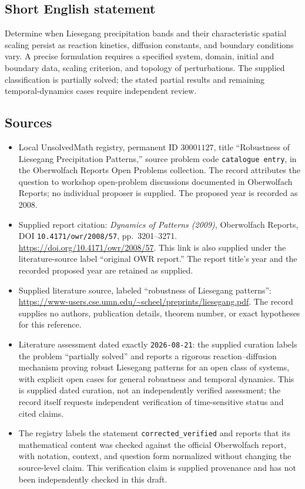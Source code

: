 \documentclass[11pt]{article}
\begin{document}
\subsection{Short English statement}
Determine when Liesegang precipitation bands and their characteristic spatial scaling persist as reaction kinetics, diffusion constants, and boundary conditions vary. A precise formulation requires a specified system, domain, initial and boundary data, scaling criterion, and topology of perturbations. The supplied classification is partially solved; the stated partial results and remaining temporal-dynamics cases require independent review.
\subsection{Sources}
\begin{itemize}
\item Local UnsolvedMath registry, permanent ID \(30001127\), title ``Robustness of Liesegang Precipitation Patterns,'' source problem code \texttt{catalogue entry}, in the Oberwolfach Reports Open Problems collection. The record attributes the question to workshop open-problem discussions documented in Oberwolfach Reports; no individual proposer is supplied. The proposed year is recorded as 2008.
\item Supplied report citation: \emph{Dynamics of Patterns (2009)}, Oberwolfach Reports, DOI \texttt{10.4171/owr/2008/57}, pp.\ 3201--3271. \url{https://doi.org/10.4171/owr/2008/57}. This link is also supplied under the literature-source label ``original OWR report.'' The report title's year and the recorded proposed year are retained as supplied.
\item Supplied literature source, labeled ``robustness of Liesegang patterns'': \url{https://www-users.cse.umn.edu/~scheel/preprints/liesegang.pdf}. The record supplies no authors, publication details, theorem number, or exact hypotheses for this reference.
\item Literature assessment dated exactly \texttt{2026-08-21}: the supplied curation labels the problem ``partially solved'' and reports a rigorous reaction--diffusion mechanism proving robust Liesegang patterns for an open class of systems, with explicit open cases for general robustness and temporal dynamics. This is supplied dated curation, not an independently verified assessment; the record itself requests independent verification of time-sensitive status and cited claims.
\item The registry labels the statement \texttt{corrected\_verified} and reports that its mathematical content was checked against the official Oberwolfach report, with notation, context, and question form normalized without changing the source-level claim. This verification claim is supplied provenance and has not been independently checked in this draft.
\end{itemize}
\end{document}
